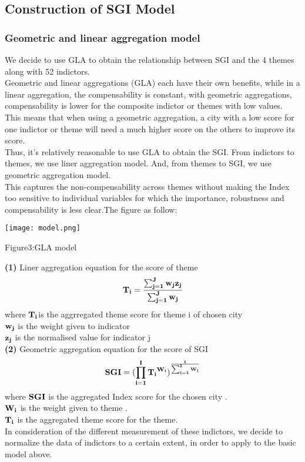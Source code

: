 \documentclass{mcmthesis}
\begin{document}
\subsection{Construction of SGI Model}%
\subsubsection{Geometric and linear aggregation model}%
We decide to use GLA to obtain the relationship between SGI and the 4 themes along with 52 indictors.\\
Geometric and linear aggregations (GLA) each have their own benefits, while in a linear aggregation, the compensability is constant, with geometric aggregations, compensability is lower for the composite indictor or themes with low values. This means that when using a geometric aggregation, a city with a low score for one indictor or theme will need a much higher score on the others to improve its score.\\
Thus, it's relatively reasonable to use GLA to obtain the SGI. From indictors to themes, we use liner aggregation model. And, from themes to SGI, we use geometric aggregation model.\\
This captures the non-compensability across themes without making the Index too sensitive to individual variables for which the importance, robustness and compensability is less clear.The figure as follow:\\
\centerline{\texttt{[image: model.png]}}
\centerline{Figure3:GLA model}
{\bf (1) } Liner aggregation equation for the score of theme\\
$$\bf T_{i}=\frac{\sum_{j=1}^{J}w_jz_{j}}{\sum_{j=1}^{J}w_j}$$
where $\bf T_{i}$is the aggrregated theme score for  theme i of chosen city\\
$\bf w_j$ is the weight given to indicator\\
$\bf z_{j}$ is the normalised value for  indicator j\\
{\bf (2) } Geometric aggregation equation for the score of SGI\\
$$\bf SGI=(\prod_{i=1}^{I}{T_{i}}^{W_i})^{\frac{1}{\sum_{i=1}^IW_i}}$$
where $\bf SGI$ is the aggregated Index score for the chosen city .\\
$\bf W_i$ is the weight given to theme .\\
$\bf T_{i}$ is the aggregated theme score for the theme.\\
In consideration of the different measurement of these indictors, we decide to normalize the data of indictors to a certain extent, in order to apply to the basic model above.\\
\end{document}
